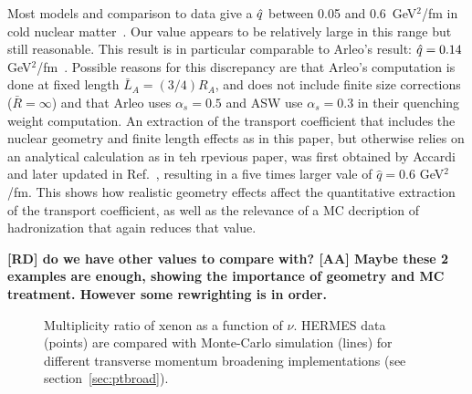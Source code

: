Most models and comparison to data give a ${\hat q}$ between 0.05 and 0.6~GeV$^2$/fm in cold nuclear matter~\cite{Accardi:2009qv}. Our value appears to be relatively large in this range but still reasonable. This result is in particular comparable to Arleo's 
result: ${\hat q} = 0.14$ GeV$^2$/fm~\cite{Arleo:2002ph,Arleo:2003jz}. Possible 
reasons for this discrepancy are that Arleo's computation is done at fixed 
length $\bar L_A = (3/4) R_A$, and does not include finite size corrections 
($\bar R = \infty$) and that Arleo uses $\alpha_s=0.5$ and ASW use 
$\alpha_s=0.3$ in their quenching weight computation. An extraction of the transport coefficient that includes the nuclear geometry and finite length effects as in this paper, but otherwise relies on an analytical calculation as in teh rpevious paper, was first obtained by Accardi \cite{Accardi:2007in} and later updated in Ref.~\cite{Accardi:2009qv}, resulting in a five times larger vale of $\hat q = 0.6$ GeV$^2$/fm. This shows how realistic geometry effects affect the quantitative extraction of the transport coefficient, as well as the relevance of a MC decription of hadronization that again reduces that value. 

{\bf [RD] do we have other values to compare with? [AA] Maybe these 2 examples are enough, showing the importance of geometry and MC treatment. However some rewrighting is in order.}


\begin{figure}[tbp]
  \centering
{}
\caption {Multiplicity ratio of xenon as a function of $\nu$. HERMES data~%
\cite{Airapetian:2011jp} (points) are compared with Monte-Carlo simulation 
(lines) for different transverse momentum broadening implementations (see 
section~\ref{sec:ptbroad}).}
\label{fig:PtC-Rnu}
\end{figure}


